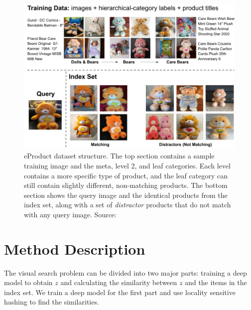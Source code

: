 \documentclass[conference]{IEEEtran}
\begin{document}
\begin{figure}[!t]
\centering
\includegraphics[scale=0.25]{structure}
\caption{eProduct dataset structure. The top section contains a sample training image and the meta,
level 2, and leaf categories. Each level contains a more specific type of product, and the leaf category
can still contain slightly different, non-matching products. 
The bottom section shows the query image and the identical products from the index set, along with a set 
of \emph{distractor} products that do not match with any query image.
Source:~\cite{jiangbo2021ebay}}

\label{fig:structure}
\end{figure}

\section{Method Description}
The visual search problem can be divided into two major parts: training a deep model
to obtain $z$ and calculating the similarity between $z$ and the items in the index set.
We train a deep model for the first part and use locality sensitive hashing to find the 
similarities.
\end{document}
